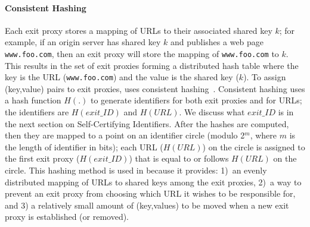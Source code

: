 \paragraph{Consistent Hashing}
Each exit proxy stores a mapping of URLs to their associated shared key $k$; for example, if 
an origin server has shared key $k$ and publishes a web page {\tt www.foo.com}, then an exit 
proxy will store the mapping of {\tt www.foo.com} to $k$.  This results in the set of exit proxies 
forming a distributed hash table where the key is the URL ({\tt www.foo.com}) and the value is the 
shared key ($k$).  To assign (key,value) pairs to exit proxies, \system{} uses consistent 
hashing~\cite{karger1997consistent,lewin1998consistent}.  Consistent hashing uses a hash function $H(.)$
to generate identifiers for both exit proxies and for URLs; the identifiers are $H(exit\_ID)$ and $H(URL)$. 
We discuss what $exit\_ID$ is in the next section on Self-Certifying Identifiers.  After the hashes are 
computed, then they are mapped to a point on an identifier circle (modulo 2$^{m}$, where $m$ is the length of 
identifier in bits); each URL ($H(URL)$) on the circle is assigned to the first exit proxy ($H(exit\_ID)$) that 
is equal to or follows $H(URL)$ on the circle.  This hashing method is used in \system{} because it provides: 
1)~an evenly distributed mapping of URLs to shared keys among the exit proxies,
2)~a way to prevent an exit 
proxy from choosing which URL it wishes to be responsible for, and 3) a relatively small amount 
of (key,values) to be moved when a new exit proxy is established (or removed).  

